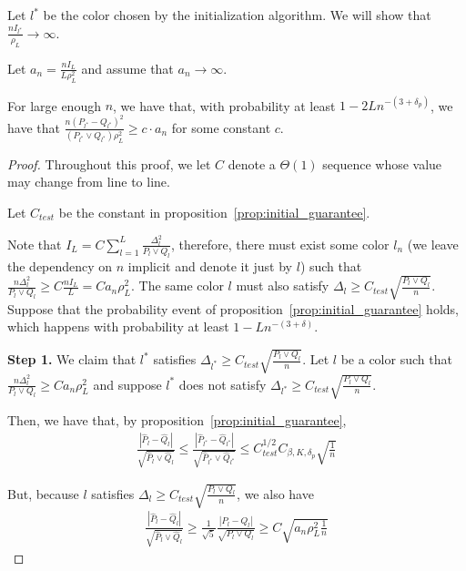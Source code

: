 Let $l^*$ be the color chosen by the initialization algorithm. We will show that $\frac{n I_{l^*}}{\rho_L} \rightarrow \infty$.

\begin{proposition}
\label{prop:initialization_correctness}
Let $a_n = \frac{ n I_L}{L \rho^2_L} $ and assume that $a_n \rightarrow \infty$.

For large enough $n$, we have that, with probability at least $1 - 2L n^{-(3+\delta_p)}$, we have that $\frac{n (P_{l^*}-Q_{l^*})^2}{(P_{l^*} \vee Q_{l^*}) \rho^2_L} \ge c \cdot a_n$ for some constant $c$. 
\end{proposition}

\begin{proof}
Throughout this proof, we let $C$ denote a $\Theta(1)$ sequence whose value may change from line to line.

Let $C_{test}$ be the constant in proposition~\ref{prop:initial_guarantee}. 

Note that $I_L = C \sum_{l=1}^L \frac{\Delta_l^2}{P_l \vee Q_l}$, therefore, there must exist some color $l_n$ (we leave the dependency on $n$ implicit and denote it just by $l$) such that $\frac{n \Delta_l^2}{P_l \vee Q_l} \geq  C \frac{n I_L}{L} = C a_n \rho^2_L$. The same color $l$ must also satisfy $\Delta_l \geq C_{test} \sqrt{\frac{P_l \vee Q_l}{n}}$. \\

Suppose that the probability event of proposition~\ref{prop:initial_guarantee} holds, which happens with probability at least $1 - L n^{-(3+\delta)}$. 

\textbf{Step 1.} We claim that $l^*$ satisfies $\Delta_{l^*} \geq C_{test} \sqrt{ \frac{P_l \vee Q_l}{n}} $. Let $l$ be a color such that $\frac{n \Delta_l^2}{P_l \vee Q_l} \geq C a_n \rho^2_L$ and suppose $l^*$ does not satisfy $\Delta_{l^*} \geq C_{test} \sqrt{ \frac{P_l \vee Q_l}{n} }$. 

Then, we have that, by proposition~\ref{prop:initial_guarantee}, 
\begin{align*}
\frac{| \hat{P}_l - \hat{Q}_l | }{\sqrt{ \hat{P}_l \vee \hat{Q}_l}} 
  \leq \frac{| \hat{P}_{l^*} - \hat{Q}_{l^*} | }{\sqrt{ \hat{P}_{l^*} \vee \hat{Q}_{l^*}}} 
         \leq C^{1/2}_{test} C_{\beta, K, \delta_p} \sqrt{ \frac{1}{n}} 
\end{align*}

But, because $l$ satisfies $\Delta_l \geq C_{test} \sqrt{ \frac{P_l \vee Q_l}{n}}$, we also have
\begin{align*}
\frac{| \hat{P}_l - \hat{Q}_l | }{\sqrt{ \hat{P}_l \vee \hat{Q}_l}} 
  \geq \frac{1}{\sqrt{5}} \frac{ | P_l - Q_l|}{\sqrt{P_l \vee Q_l}} 
   \geq C \sqrt{ a_n \rho^2_L \frac{1}{n}}
\end{align*}


\end{proof}
